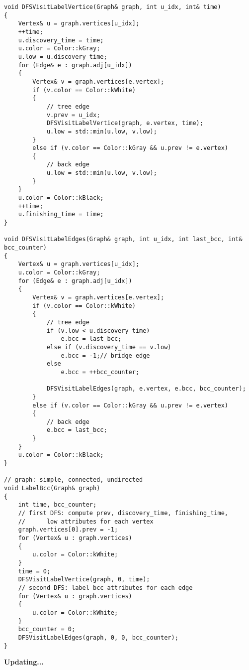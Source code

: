 \begin{verbatim}
void DFSVisitLabelVertice(Graph& graph, int u_idx, int& time)
{
    Vertex& u = graph.vertices[u_idx];
    ++time;
    u.discovery_time = time;
    u.color = Color::kGray;
    u.low = u.discovery_time;
    for (Edge& e : graph.adj[u_idx])
    {
        Vertex& v = graph.vertices[e.vertex];
        if (v.color == Color::kWhite)
        {
            // tree edge
            v.prev = u_idx;
            DFSVisitLabelVertice(graph, e.vertex, time);
            u.low = std::min(u.low, v.low);
        }
        else if (v.color == Color::kGray && u.prev != e.vertex)
        {
            // back edge
            u.low = std::min(u.low, v.low);
        }
    }
    u.color = Color::kBlack;
    ++time;
    u.finishing_time = time;
}

void DFSVisitLabelEdges(Graph& graph, int u_idx, int last_bcc, int& bcc_counter)
{
    Vertex& u = graph.vertices[u_idx];
    u.color = Color::kGray;
    for (Edge& e : graph.adj[u_idx])
    {
        Vertex& v = graph.vertices[e.vertex];
        if (v.color == Color::kWhite)
        {
            // tree edge
            if (v.low < u.discovery_time)
                e.bcc = last_bcc;
            else if (v.discovery_time == v.low)
                e.bcc = -1;// bridge edge
            else
                e.bcc = ++bcc_counter;
            
            DFSVisitLabelEdges(graph, e.vertex, e.bcc, bcc_counter);
        }
        else if (v.color == Color::kGray && u.prev != e.vertex)
        {
            // back edge
            e.bcc = last_bcc;
        }
    }
    u.color = Color::kBlack;
}

// graph: simple, connected, undirected
void LabelBcc(Graph& graph)
{
    int time, bcc_counter;
    // first DFS: compute prev, discovery_time, finishing_time, 
    //      low attributes for each vertex
    graph.vertices[0].prev = -1;
    for (Vertex& u : graph.vertices)
    {
        u.color = Color::kWhite;
    }
    time = 0;
    DFSVisitLabelVertice(graph, 0, time);
    // second DFS: label bcc attributes for each edge
    for (Vertex& u : graph.vertices)
    {
        u.color = Color::kWhite;
    }
    bcc_counter = 0;
    DFSVisitLabelEdges(graph, 0, 0, bcc_counter);
}
\end{verbatim}

\centerline{\textbf{Updating...}}


